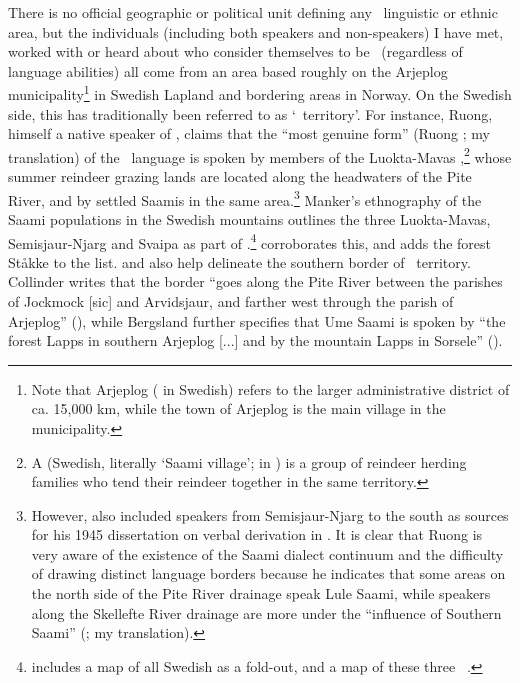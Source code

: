 There is no official geographic or political unit defining any \PS\ linguistic or ethnic area, but the individuals (including both speakers and non-speakers) I have met, worked with or heard about who consider themselves to be \PS\ (regardless of language abilities) all come from an area based roughly on the Arjeplog municipality\footnote{Note that Arjeplog  ( in Swedish) refers to the larger administrative district of ca. 15,000 km, while the town of Arjeplog is the main village in the municipality.} 
in Swedish Lapland and bordering areas in Norway. On the Swedish side, this has traditionally been referred to as  ‘\PS\ territory’. 
For instance, Ruong, himself a native speaker of \PS, claims that the “most genuine form” (Ruong \citeyear[iii]{Ruong1943}; my translation) of the \PS\ language is spoken by members of the Luokta-Mavas ,\footnote{A  (Swedish, literally ‘Saami village’;  in \PL) is a group of reindeer herding families who tend their reindeer together in the same territory.} 
whose summer reindeer grazing lands are located along the headwaters of the Pite River, and by settled Saamis in the same area.\footnote{However, \citeauthor{Ruong1945} also included speakers from Semisjaur-Njarg  to the south as sources for his 1945 dissertation on verbal derivation in \PS. It is clear that Ruong is very aware of the existence of the Saami dialect continuum and the difficulty of drawing distinct language borders because he indicates that some areas on the north side of the Pite River drainage speak Lule Saami, while speakers along the Skellefte River drainage are more under the “influence of Southern Saami” (\citealt[iii]{Ruong1945}; my translation).} 
Manker’s ethnography of the Saami populations in the Swedish mountains \citep{Manker1947} outlines the three  Luokta-Mavas, Semisjaur-Njarg and Svaipa as part of .\footnote{\citet[473]{Manker1947} includes a map of all Swedish  as a fold-out, and a map of these three \PS\ .} 
\citet[22]{Sammallahti1998} corroborates this, and adds the forest  Ståkke to the list. \citeauthor{Collinder1960} and \citeauthor{Bergsland1962} also help delineate the southern border of \PS\ territory. Collinder writes that the border “goes along the Pite River between the parishes of Jockmock [sic] and Arvidsjaur, and farther west through the parish of Arjeplog” (\citeyear[23]{Collinder1960}), while Bergsland further specifies that Ume Saami is spoken by “the forest Lapps in southern Arjeplog [...] and by the mountain Lapps in Sorsele” (\citeyear[27]{Bergsland1962}). %

